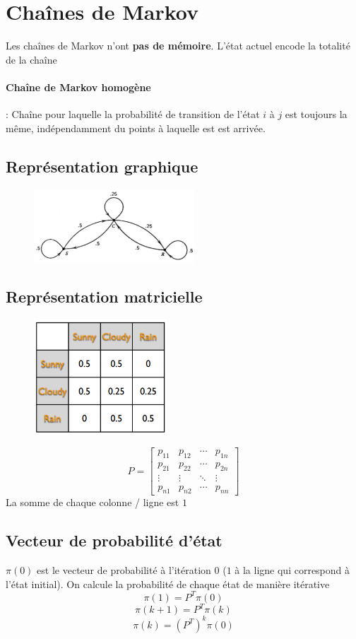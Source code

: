\documentclass[resume]{subfiles}
\begin{document}
\section{Chaînes de Markov}
Les chaînes de Markov n'ont \textbf{pas de mémoire}. L'état actuel encode la totalité de la chaîne
\paragraph{Chaîne de Markov homogène} : Chaîne pour laquelle la probabilité de transition de l'état $i$ à $j$ est toujours la même, indépendamment du points à laquelle est est arrivée.
\subsection{Représentation graphique}
\begin{figure}[H]
\centering
\includegraphics[width=6cm]{img_15.png}
\end{figure}
\subsection{Représentation matricielle}
\begin{figure}[H]
\centering
\includegraphics[width=5cm]{img_16.png}
\end{figure}
$$P=\begin{bmatrix}
p_{11} & p_{12} & \cdots & p_{1n}\\
p_{21} & p_{22} & \cdots & p_{2n}\\
\vdots & \vdots & \ddots & \vdots\\
p_{n1} & p_{n2} & \cdots & p_{nn}
\end{bmatrix}$$
La somme de chaque colonne / ligne est $1$
\subsection{Vecteur de probabilité d'état}
$\pi(0)$ est le vecteur de probabilité à l'itération 0 ($1$ à la ligne qui correspond à l'état initial). On calcule la probabilité de chaque état de manière itérative
$$\pi(1)=P^{T}\pi(0)$$
$$\pi(k+1)=P^{T}\pi(k)$$
$$\pi(k)=(P^{T})^{k}\pi(0)$$
\end{document}
